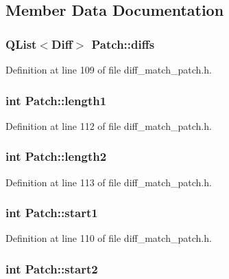 \subsection{Member Data Documentation}
\hypertarget{class_patch_a5017c7eb1118cc8ebe7030dd7a86475a}{
\subsubsection[{diffs}]{\setlength{\rightskip}{0pt plus 5cm}QList$<${\bf Diff}$>$ {\bf Patch::diffs}}}
\label{class_patch_a5017c7eb1118cc8ebe7030dd7a86475a}


Definition at line 109 of file diff\_\-match\_\-patch.h.

\hypertarget{class_patch_a6f1d748d94184a8f492bece1f967777d}{
\subsubsection[{length1}]{\setlength{\rightskip}{0pt plus 5cm}int {\bf Patch::length1}}}
\label{class_patch_a6f1d748d94184a8f492bece1f967777d}


Definition at line 112 of file diff\_\-match\_\-patch.h.

\hypertarget{class_patch_a9ef05324cac27ec93ebd0be4270e9d1e}{
\subsubsection[{length2}]{\setlength{\rightskip}{0pt plus 5cm}int {\bf Patch::length2}}}
\label{class_patch_a9ef05324cac27ec93ebd0be4270e9d1e}


Definition at line 113 of file diff\_\-match\_\-patch.h.

\hypertarget{class_patch_ae2fbf0aefd6ab5aeec4379cf388ff158}{
\subsubsection[{start1}]{\setlength{\rightskip}{0pt plus 5cm}int {\bf Patch::start1}}}
\label{class_patch_ae2fbf0aefd6ab5aeec4379cf388ff158}


Definition at line 110 of file diff\_\-match\_\-patch.h.

\hypertarget{class_patch_a1ceab2853be39f706627f98e4d2ad8d6}{
\subsubsection[{start2}]{\setlength{\rightskip}{0pt plus 5cm}int {\bf Patch::start2}}}
\label{class_patch_a1ceab2853be39f706627f98e4d2ad8d6}


